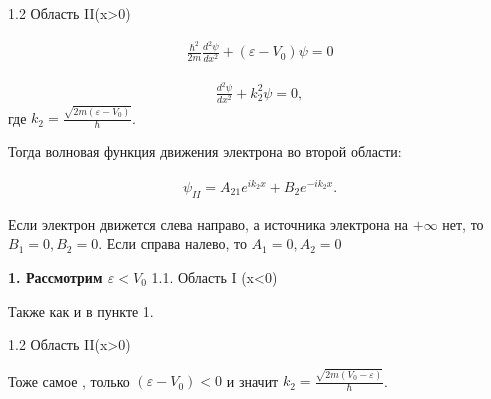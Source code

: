 1.2 Область II(x>0)


\begin{gather}
\label{movi5}
\frac{\hbar^{2}}{2m}\frac{d^{2}\psi}{dx^{2}}+(\varepsilon-V_{0})\psi=0
\end{gather}

\begin{gather}
\label{movi6}
\frac{d^{2}\psi}{dx^{2}}+k_{2}^{2}\psi=0,
\end{gather}
где $k_{2}=\frac{\sqrt{2m(\varepsilon-V_{0})}}{\hbar}$.

Тогда волновая функция движения электрона во второй  области:

\begin{gather}
\label{movi7}
\psi_{II}=A_{21}e^{ik_{2}x}+B_{2}e^{-ik_{2}x}.
\end{gather}

Если электрон движется слева направо, а источника электрона на $+\infty$ нет, то $B_{1}=0, B_{2}=0$. Если справа налево, то  $A_{1}=0, A_{2}=0$

\textbf{1. Рассмотрим  $\varepsilon<V_{0}$ }
1.1. Область I (x<0)

Также как и в пункте 1.


1.2 Область II(x>0)

Тоже самое , только $(\varepsilon-V_{0})<0$ и значит  $k_{2}=\frac{\sqrt{2m(V_{0}-\varepsilon)}}{\hbar}$.
